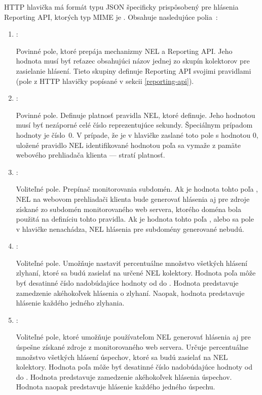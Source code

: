 HTTP hlavička  má formát typu JSON špecificky prispôsobený pre hlásenia Reporting API, ktorých typ MIME je .
Obsahuje nasledujúce \mbox{polia \cite{W3C-NEL}}:
\begin{enumerate}
    \item {}:

    Povinné pole, ktoré prepája mechanizmy NEL a Reporting API.
    Jeho hodnota musí byť reťazec obsahujúci názov jednej zo skupín kolektorov pre zasielanie hlásení.
    Tieto skupiny definuje Reporting API svojimi pravidlami (pole  z HTTP hlavičky  popísané v sekcii \ref{reporting-api}).
    
    \item {}:

    Povinné pole.
    Definuje platnosť pravidla NEL, ktoré definuje.
    Jeho hodnotou musí byť nezáporné celé číslo reprezentujúce sekundy.
    Špeciálnym prípadom hodnoty je \mbox{číslo 0}.
    V prípade, že je v hlavičke zaslané toto pole s hodnotou 0, uložené pravidlo NEL identifikované hodnotou poľa  sa vymaže z pamäte webového prehliadača klienta --- stratí platnosť. 
    
    \item {}:

    Voliteľné pole. Prepínač monitorovania subdomén. 
    Ak je hodnota tohto poľa , NEL na webovom prehliadači klienta bude generovať hlásenia aj pre zdroje získané zo subdomén monitorovaného web servera, ktorého doména 
    bola použitá na definíciu tohto pravidla.
    Ak je hodnota tohto poľa , alebo sa pole v hlavičke nenachádza, NEL hlásenia pre subdomény generované nebudú.

    \item {}:

    Voliteľné pole. Umožňuje nastaviť percentuálne množstvo všetkých hlásení zlyhaní, ktoré sa budú zasielať na určené NEL kolektory.
    Hodnota poľa môže byť desatinné číslo nadobúdajúce hodnoty od  do .
    Hodnota  predstavuje zamedzenie akéhokoľvek hlásenia o zlyhaní. 
    Naopak, hodnota  predstavuje hlásenie každého jedného zlyhania.

    \item {}:

    Voliteľné pole, ktoré umožňuje používateľom NEL generovať hlásenia aj pre úspešne získané zdroje z monitorovaného web servera. Určuje percentuálne množstvo všetkých hlásení úspechov, ktoré sa budú zasielať na NEL kolektory.
    Hodnota poľa môže byť desatinné číslo nadobúdajúce hodnoty od  do .
    Hodnota  predstavuje zamedzenie akéhokoľvek hlásenia úspechov. 
    Hodnota  naopak predstavuje hlásenie každého jedného úspechu.


\end{enumerate}
